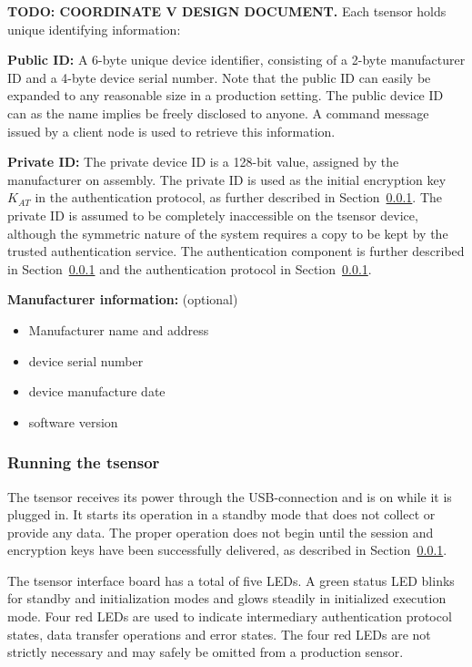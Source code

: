 \textbf{TODO: COORDINATE V DESIGN DOCUMENT.}
Each tsensor holds unique identifying information:
\begin{description}
\item \textbf{Public ID:} A 6-byte unique device identifier, consisting of a 2-byte manufacturer ID and a 4-byte device serial number. Note that the public ID can easily be expanded to any reasonable size in a production setting. The public device ID can as the name implies be freely disclosed to anyone. A command message issued by a client node is used to retrieve this information.
\item \textbf{Private ID:} The private device ID is a 128-bit value, assigned by the manufacturer on assembly. The private ID is used as the initial encryption key $K_{AT}$ in the authentication protocol, as further described in Section~\ref{}. The private ID is assumed to be completely inaccessible on the tsensor device, although the symmetric nature of the system requires a copy to be kept by the trusted authentication service. The authentication component is further described in Section~\ref{} and the authentication protocol in Section~\ref{}.
\item \textbf{Manufacturer information:} (optional)
\begin{itemize}
\item Manufacturer name and address
\item device serial number
\item device manufacture date
\item software version
\end{itemize}
\end{description}

\subsubsection{Running the tsensor}

The tsensor receives its power through the USB-connection and is on while it is plugged in. It starts its operation in a standby mode that does not collect or provide any data. The proper operation does not begin until the session and encryption keys have been successfully delivered, as described in Section~\ref{}.

The tsensor interface board has a total of five LEDs. A green status LED blinks for standby and initialization modes and glows steadily in initialized execution mode. Four red LEDs are used to indicate intermediary authentication protocol states, data transfer operations and error states. The four red LEDs are not strictly necessary and may safely be omitted from a production sensor.

